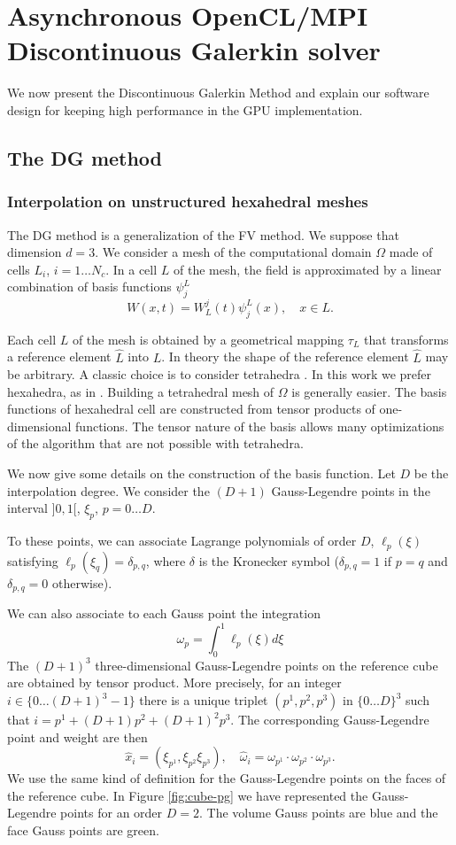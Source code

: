 \documentclass[12pt]{amsart}
\begin{document}
\section{\label{async}Asynchronous OpenCL/MPI Discontinuous Galerkin solver}

We now present the Discontinuous Galerkin Method and explain our software
design for keeping high performance in the GPU implementation.
\subsection{The DG method}

\subsubsection{Interpolation on unstructured hexahedral meshes}
The DG method is a generalization of the FV method. We suppose that dimension $d=3$.
We consider a mesh of the computational domain $\Omega$ made of cells $L_i$, $i=1\ldots N_c$.
 In a cell $L$ of the mesh, the
field is approximated by a linear combination of  basis functions $\psi_j^L$
\begin{equation}\label{eq:expansion}
W(x,t)=W_{L}^{j}(t)\psi_{j}^{L}(x),\quad x\in L.
\end{equation}

Each cell $L$ of the mesh is obtained by a geometrical mapping $\tau_L$ that transforms a reference element $\hat L$ into $L$.
In theory the shape of the reference element $\hat L$ may be arbitrary. A classic choice is to consider tetrahedra \cite{hesthaven-2009}. In this work we prefer hexahedra, as in \cite{CFP06}. Building a tetrahedral mesh of $\Omega$ is generally easier. The basis functions of hexahedral cell are  constructed from tensor products of one-dimensional functions. The tensor nature of the basis allows many optimizations of the algorithm that are not possible with tetrahedra.

We now give some details on the construction of the basis function. Let $D$ be the interpolation degree. We consider the $(D+1)$ Gauss-Legendre points in the interval $]0,1[$, $\xi_p$, $p=0\ldots D$.

To these points, we can associate Lagrange polynomials of order $D$, $\ell_p(\xi)$ satisfying $\ell_p(\xi_q)=\delta_{p,q}$, where $\delta$ is the Kronecker symbol ($\delta_{p,q}=1$ if $p=q$ and $\delta_{p,q}=0$ otherwise).

We can also associate to each Gauss point the integration
$$
\omega_p =\int_0^1 \ell_p(\xi)d\xi
$$
The $(D+1)^3$ three-dimensional Gauss-Legendre points on the reference cube are obtained by tensor product. More precisely, for an integer $i\in\{0\ldots (D+1)^3-1\}$ there is a unique triplet $(p^1,p^2,p^3)$ in $\{0\ldots D\}^3$ such that $i=p^1+(D+1)p^2+(D+1)^2p^3$. The corresponding Gauss-Legendre point and weight are then
$$ \hat x _i = (\xi_{p^1},\xi_{p^2}\xi_{p^3}),\quad \hat \omega_i =\omega_{p^1}\cdot\omega_{p^2}\cdot\omega_{p^3}.$$ We use the same kind of definition for the Gauss-Legendre points on the faces of the reference cube. In Figure \ref{fig:cube-pg} we have represented the Gauss-Legendre points for an order $D=2$. The volume Gauss points are blue and the face Gauss points are green.
\end{document}
